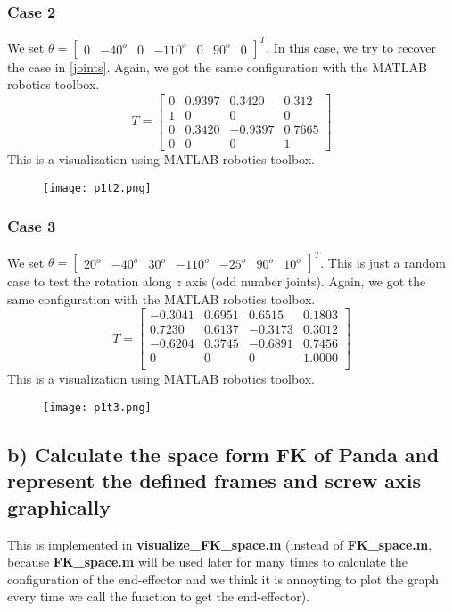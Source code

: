 \documentclass[english,10pt,a4paper]{article}
\begin{document}
    \subsubsection*{Case 2}
    We set $\theta = \begin{bmatrix}
        0 & -40^o & 0 & -110^o & 0 & 90^o & 0
    \end{bmatrix}^T$. In this case, we try to recover the case in \ref{joints}. Again, we got the same configuration with the MATLAB robotics toolbox.
    $$T = \begin{bmatrix}
        0 & 0.9397 & 0.3420 & 0.312 \\ 1 & 0 & 0 & 0\\ 0 & 0.3420 & -0.9397 & 0.7665\\ 0 & 0 & 0 & 1
    \end{bmatrix}$$
    This is a visualization using MATLAB robotics toolbox.
    \begin{figure}[H]
        \texttt{[image: p1t2.png]}
    \end{figure}
    
    \subsubsection*{Case 3}
    We set $\theta = \begin{bmatrix}
        20^o & -40^o & 30^o & -110^o & -25^o & 90^o & 10^o
    \end{bmatrix}^T$. This is just a random case to test the rotation along $z$ axis (odd number joints). Again, we got the same configuration with the MATLAB robotics toolbox.
    $$T = \begin{bmatrix}
           -0.3041 &   0.6951  & 0.6515  &  0.1803 \\
        0.7230 &   0.6137 &  -0.3173  &  0.3012\\
        -0.6204  &  0.3745  & -0.6891  &  0.7456\\
        0      &   0     &    0  &  1.0000\\
    \end{bmatrix}$$
    This is a visualization using MATLAB robotics toolbox.
    \begin{figure}[H]
        \texttt{[image: p1t3.png]}
    \end{figure}
	
    \subsection*{b) Calculate the space form FK of Panda and represent the defined frames and screw axis graphically}
    This is implemented in \textbf{visualize\_FK\_space.m} (instead of \textbf{FK\_space.m}, because \textbf{FK\_space.m} will be used later for many times to calculate the configuration of the end-effector and we think it is annoyting to plot the graph every time we call the function to get the end-effector).
	
\end{document}
